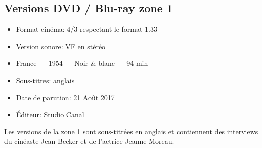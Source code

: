 \subsection*{Versions DVD / Blu-ray zone 1}

\begin{itemize}
	\item Format cinéma: 4/3 respectant le format 1.33
	\item Version sonore: VF en stéréo
	\item France --- 1954 --- Noir \& blanc --- 94 min
	\item Sous-titres: anglais
	\item Date de parution: 21 Août 2017
	\item Éditeur: Studio Canal
\end{itemize}

Les versions de la zone 1 sont sous-titrées en anglais et contiennent des interviews du cinéaste Jean Becker et de l'actrice Jeanne Moreau.
